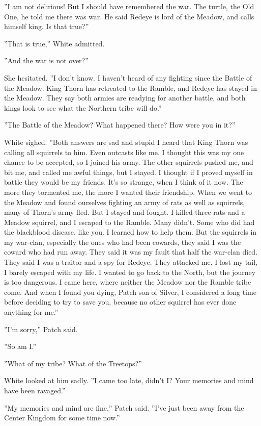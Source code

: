 \documentclass[12pt]{book}
\begin{document}
''I am not delirious! But I should have remembered the war. The turtle, the Old One, he told me there was war. He said Redeye is lord of the Meadow, and calls himself king. Is that true?''

''That is true,'' White admitted.

''And the war is not over?''

She hesitated. ''I don't know. I haven't heard of any fighting since the Battle of the Meadow. King Thorn has retreated to the Ramble, and Redeye has stayed in the Meadow. They say both armies are readying for another battle, and both kings look to see what the Northern tribe will do.''

''The Battle of the Meadow? What happened there? How were you in it?''

White sighed. ''Both answers are sad and stupid %
I heard that King Thorn was calling all squirrels to him. Even outcasts like me. I thought this was my one chance to be accepted, so I joined his army. The other squirrels pushed me, and bit me, and called me awful things, but I stayed. I thought if I proved myself in battle they would be my friends. It's so strange, when I think of it now. The more they tormented me, the more I wanted their friendship. When we went to the Meadow and found ourselves fighting an army of rats as well as squirrels, many of Thorn's army fled. But I stayed and fought. I killed three rats and a Meadow squirrel, and I escaped to the Ramble. Many didn't. Some who did had the blackblood disease, like you. I learned how to help them. But the squirrels in my war-clan, especially the ones who had been cowards, they said I was the coward who had run away. They said it was my fault that half the war-clan died. They said I was a traitor and a spy for Redeye. They attacked me, I lost my tail, I barely escaped with my life. I wanted to go back to the North, but the journey is too dangerous. I came here, where neither the Meadow nor the Ramble tribe come. And when I found you dying, Patch son of Silver, I considered a long time before deciding to try to save you, because no other squirrel has ever done anything for me.''

''I'm sorry,'' Patch said.

''So am I.''

''What of my tribe? What of the Treetops?''

White looked at him sadly. ''I came too late, didn't I? Your memories and mind have been ravaged.''

''My memories and mind are fine,'' Patch said. ''I've just been away from the Center Kingdom for some time now.''
\end{document}

